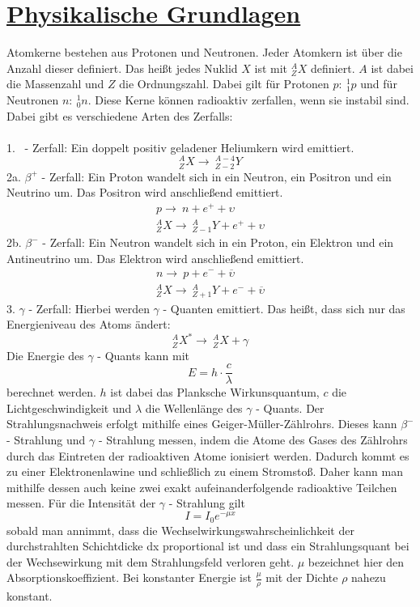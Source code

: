 \documentclass[11pt,a4paper]{article}
\begin{document}
\section{\underline{Physikalische Grundlagen}}
Atomkerne bestehen aus Protonen und Neutronen. Jeder Atomkern ist über die Anzahl
dieser definiert. Das heißt jedes Nuklid $X$ ist mit $^A_Z{X}$ definiert. $A$ ist dabei
die Massenzahl und $Z$ die Ordnungszahl. Dabei gilt für Protonen $p:~^1_1p$ und für
Neutronen $n:~^1_0n$. Diese Kerne können radioaktiv zerfallen, wenn sie instabil
sind. Dabei gibt es verschiedene Arten des Zerfalls:
\\\\
1. \alpha~- Zerfall: Ein doppelt positiv geladener Heliumkern wird emittiert.
\begin{equation}
    ^A_Z{X} \rightarrow~^{A-4}_{Z-2}Y
\end{equation}
2a. $\beta ^+$ - Zerfall: Ein Proton wandelt sich in ein Neutron, ein Positron und ein
Neutrino um. Das Positron wird anschließend emittiert.
\begin{align}
  p \rightarrow~n + e^+ + \upsilon \\
    ^A_ZX \rightarrow~{^A_{Z-1}Y} + e^+ + \upsilon
\end{align}
2b. $\beta ^-$ - Zerfall: Ein Neutron wandelt sich in ein Proton, ein Elektron und ein
Antineutrino um. Das Elektron wird anschließend emittiert.
\begin{align}
  n \rightarrow~p + e^- + \overline{\upsilon} \\
    ^A_ZX \rightarrow~{^A_{Z+1}Y} + e^- + \overline{\upsilon}
\end{align}
3. $\gamma$ - Zerfall: Hierbei werden $\gamma$ - Quanten emittiert. Das heißt, dass sich nur das Energieniveau des Atoms ändert:
\begin{equation}
    ^A_ZX^* \rightarrow~{^A_ZX} + \gamma
\end{equation}
Die Energie des $\gamma$ - Quants kann mit
\begin{equation}
  E = h \cdot \frac{c}{\lambda}
\end{equation}
berechnet werden. $h$ ist dabei das Planksche Wirkunsquantum, $c$ die
Lichtgeschwindigkeit und $\lambda$ die Wellenlänge des $\gamma$ - Quants.
Der Strahlungsnachweis erfolgt mithilfe eines Geiger-Müller-Zählrohrs. Dieses kann
$\beta^-$ - Strahlung und $\gamma$ - Strahlung messen, indem die Atome des Gases des
Zählrohrs durch das Eintreten der radioaktiven Atome ionisiert werden. Dadurch kommt
es zu einer Elektronenlawine und schließlich zu einem Stromstoß. Daher kann man
mithilfe dessen auch keine zwei exakt aufeinanderfolgende radioaktive Teilchen messen.
Für die Intensität der $\gamma$ - Strahlung gilt
\begin{equation}
  I = I_0e^{- \mu x}
\end{equation}
sobald man annimmt, dass die Wechselwirkungswahrscheinlichkeit der durchstrahlten
Schichtdicke dx proportional ist und dass ein Strahlungsquant bei der Wechsewirkung
mit dem Strahlungsfeld verloren geht. $\mu$ bezeichnet hier den
Absorptionskoeffizient. Bei konstanter Energie ist $\frac{\mu}{\rho}$ mit der Dichte
$\rho$ nahezu konstant.
\end{document}
